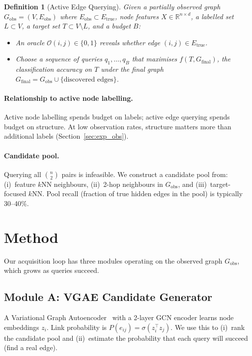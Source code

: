 \documentclass{article}
\newtheorem{definition}{Definition}
\begin{document}
\begin{definition}[Active Edge Querying]
Given a partially observed graph $G_\mathrm{obs} = (V, E_\mathrm{obs})$ where $E_\mathrm{obs} \subset E_\mathrm{true}$, node features $X \in \mathbb{R}^{n \times d}$, a labelled set $L \subset V$, a target set $T \subset V \setminus L$, and a budget $B$:
\begin{itemize}
    \item An \emph{oracle} $\mathcal{O}(i,j) \in \{0,1\}$ reveals whether edge $(i,j) \in E_\mathrm{true}$.
    \item Choose a sequence of queries $q_1, \ldots, q_B$ that maximises $f(T, G_\mathrm{final})$, the classification accuracy on $T$ under the final graph $G_\mathrm{final} = G_\mathrm{obs} \cup \{\text{discovered edges}\}$.
\end{itemize}
\end{definition}

\paragraph{Relationship to active node labelling.}
Active node labelling spends budget on labels; active edge querying spends budget on structure.
At low observation rates, structure matters more than additional labels (Section~\ref{sec:exp_obs}).

\paragraph{Candidate pool.}
Querying all $\binom{n}{2}$ pairs is infeasible.
We construct a candidate pool from: (i)~feature $k$NN neighbours, (ii)~2-hop neighbours in $G_\mathrm{obs}$, and (iii)~target-focused $k$NN.
Pool recall (fraction of true hidden edges in the pool) is typically 30--40\%.


\section{Method}
\label{sec:method}

Our acquisition loop has three modules operating on the observed graph $G_\mathrm{obs}$, which grows as queries succeed.

\subsection{Module A: VGAE Candidate Generator}

A Variational Graph Autoencoder~\cite{kipf2016variational} with a 2-layer GCN encoder learns node embeddings $z_i$.
Link probability is $P(e_{ij}) = \sigma(z_i^\top z_j)$.
We use this to (i)~rank the candidate pool and (ii)~estimate the probability that each query will succeed (find a real edge).
\end{document}
